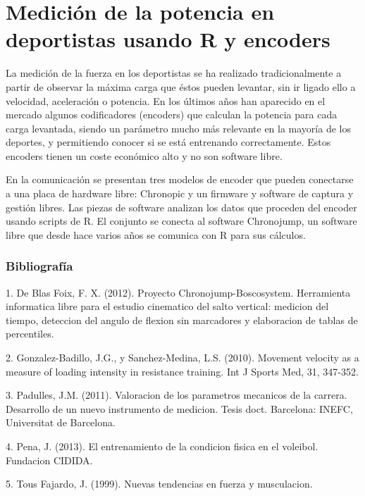 \chapter{Medición de la potencia en deportistas usando R y encoders}




La medición de la fuerza en los deportistas se ha realizado tradicionalmente a partir de observar la máxima carga que éstos pueden levantar, sin ir ligado ello a velocidad, aceleración o potencia. En los últimos años han aparecido en el mercado algunos codificadores (encoders) que calculan la potencia para cada carga levantada, siendo un parámetro mucho más relevante en la mayoría de los deportes, y permitiendo conocer si se está entrenando correctamente. Estos encoders tienen un coste económico alto y no son software libre.

En la comunicación se presentan tres modelos de encoder que pueden conectarse a una placa de hardware libre: Chronopic y un firmware y software de captura y gestión libres. Las piezas de software analizan los datos que proceden del encoder usando scripts de R. El conjunto se conecta al software Chronojump, un software libre que desde hace varios años se comunica con R para sus cálculos.
 \bigskip\subsection*{Bibliografía}

 1. De Blas Foix, F. X. (2012). Proyecto Chronojump-Boscosystem. Herramienta informatica libre para el estudio cinematico del salto vertical: medicion del tiempo, deteccion del angulo de flexion sin marcadores y elaboracion de tablas de percentiles.



2. Gonzalez-Badillo, J.G., y Sanchez-Medina, L.S. (2010). Movement velocity as a measure of loading intensity in resistance training. Int J Sports Med, 31, 347-352.



3. Padulles, J.M. (2011). Valoracion de los parametros mecanicos de la carrera. Desarrollo de un nuevo instrumento de medicion. Tesis doct. Barcelona: INEFC, Universitat de Barcelona.



4. Pena, J. (2013). El entrenamiento de la condicion fisica en el voleibol. Fundacion CIDIDA.



5. Tous Fajardo, J. (1999). Nuevas tendencias en fuerza y musculacion.

%

%
